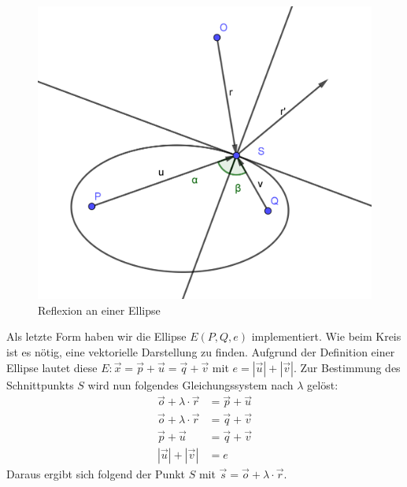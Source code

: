 \documentclass[a4paper, 11pt]{scrartcl}
\begin{document}
\begin{figure}
\includegraphics[scale=0.7]{pictures/OvalRef.png}
\caption{Reflexion an einer Ellipse}
\end{figure}
Als letzte Form haben wir die Ellipse $E(P, Q, e)$ implementiert.
Wie beim Kreis ist es nötig, eine vektorielle Darstellung zu finden. 
Aufgrund der Definition einer Ellipse lautet diese $E: \vec{x} = \vec{p} + \vec{u} = \vec{q} + \vec{v}$ mit $ e = |\vec{u}| + |\vec{v}|$.
Zur Bestimmung des Schnittpunkts $S$ wird nun folgendes Gleichungssystem nach $\lambda$ gelöst:
\begin{equation*}
\begin{split}
\vec{o} + \lambda \cdot \vec{r} &= \vec{p} + \vec{u} \\
\vec{o} + \lambda \cdot \vec{r} &= \vec{q} + \vec{v} \\
\vec{p} + \vec{u} &= \vec{q} + \vec{v} \\
|\vec{u}| + |\vec{v}| &= e
\end{split}
\end{equation*}
Daraus ergibt sich folgend der Punkt $S$ mit $\vec{s} = \vec{o} + \lambda \cdot \vec{r}$.







\end{document}
